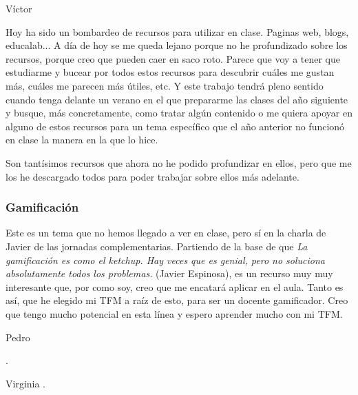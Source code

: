 \begin{opin}{\victorcolor}{Víctor}

Hoy ha sido un bombardeo de recursos para utilizar en clase. Paginas web, blogs, educalab... 
%
A día de hoy se me queda lejano porque no he profundizado sobre los recursos, porque creo que pueden caer en saco roto.
%
Parece que voy a tener que estudiarme y bucear por todos estos recursos para descubrir cuáles me gustan más, cuáles me parecen más útiles, etc.
%
Y este trabajo tendrá pleno sentido cuando tenga delante un verano en el que prepararme las clases del año siguiente y busque, más concretamente, como tratar algún contenido o me quiera apoyar en alguno de estos recursos para un tema específico que el año anterior no funcionó en clase la manera en la que lo hice.

Son tantísimos recursos que ahora no he podido profundizar en ellos, pero que me los he descargado todos para poder trabajar sobre ellos más adelante.

\subsubsection{Gamificación}

Este es un tema que no hemos llegado a ver en clase, pero sí en la charla de Javier de las jornadas complementarias.
%
Partiendo de la base de que \textit{La gamificación es como el ketchup. Hay veces que es genial, pero no soluciona absolutamente todos los problemas.} (Javier Espinosa), es un recurso muy muy interesante que, por como soy, creo que me encatará aplicar en el aula.
%
Tanto es así, que he elegido mi TFM a raíz de esto, para ser un docente gamificador. 
%
Creo que tengo mucho potencial en esta línea y espero aprender mucho con mi TFM.

\end{opin}

\begin{opin}{\pedrocolor}{Pedro}

.


\end{opin}

\begin{opin}{\virgicolor}{Virginia}
.


\end{opin}
